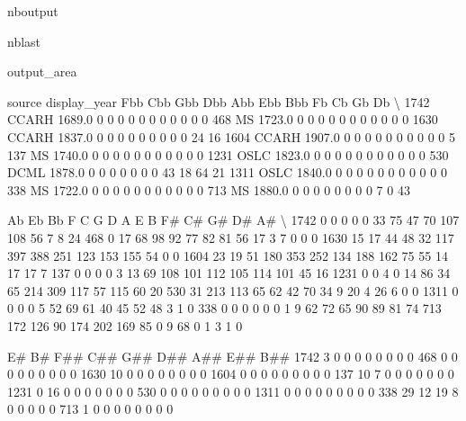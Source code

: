\documentclass[letterpaper,10pt,english]{sphinxmanual}
\begin{document}
\begin{sphinxuseclass}{nboutput}
\begin{sphinxuseclass}{nblast}
{\begin{sphinxuseclass}{output_area}
\begin{sphinxuseclass}{}
\begin{sphinxVerbatim}[commandchars=\\\{\}]
     source  display\_year  Fbb  Cbb  Gbb  Dbb  Abb  Ebb  Bbb  Fb  Cb  Gb  Db  \textbackslash{}
1742  CCARH        1689.0    0    0    0    0    0    0    0   0   0   0   0
468      MS        1723.0    0    0    0    0    0    0    0   0   0   0   0
1630  CCARH        1837.0    0    0    0    0    0    0    0   0   0  24  16
1604  CCARH        1907.0    0    0    0    0    0    0    0   0   0   0   5
137      MS        1740.0    0    0    0    0    0    0    0   0   0   0   0
1231   OSLC        1823.0    0    0    0    0    0    0    0   0   0   0   0
530    DCML        1878.0    0    0    0    0    0    0    0  43  18  64  21
1311   OSLC        1840.0    0    0    0    0    0    0    0   0   0   0   0
338      MS        1722.0    0    0    0    0    0    0    0   0   0   0   0
713      MS        1880.0    0    0    0    0    0    0    0   0   7   0  43

       Ab   Eb   Bb    F    C    G    D    A    E    B   F\#   C\#   G\#  D\#  A\#  \textbackslash{}
1742    0    0    0    0    0   33   75   47   70  107  108   56    7   8  24
468     0   17   68   98   92   77   82   81   56   17    3    7    0   0   0
1630   15   17   44   48   32  117  397  388  251  123  153  155   54   0   0
1604   23   19   51  180  353  252  134  188  162   75   55   14   17  17   7
137     0    0    0    0    3   13   69  108  101  112  105  114  101  45  16
1231    0    0    4    0   14   86   34   65  214  309  117   57  115  60  20
530    31  213  113   65   62   42   70   34    9   20    4   26    6   0   0
1311    0    0    0    0    5   52   69   61   40   45   52   48    3   1   0
338     0    0    0    0    0    0    1    9   62   72   65   90   89  81  74
713   172  126   90  174  202  169   85    0    9   68    0    1    3   1   0

      E\#  B\#  F\#\#  C\#\#  G\#\#  D\#\#  A\#\#  E\#\#  B\#\#
1742   3   0    0    0    0    0    0    0    0
468    0   0    0    0    0    0    0    0    0
1630  10   0    0    0    0    0    0    0    0
1604   0   0    0    0    0    0    0    0    0
137   10   7    0    0    0    0    0    0    0
1231   0  16    0    0    0    0    0    0    0
530    0   0    0    0    0    0    0    0    0
1311   0   0    0    0    0    0    0    0    0
338   29  12   19    8    0    0    0    0    0
713    1   0    0    0    0    0    0    0    0
\end{sphinxVerbatim}



\end{sphinxuseclass}
\end{sphinxuseclass}
}

\end{sphinxuseclass}
\end{sphinxuseclass}
\end{document}
